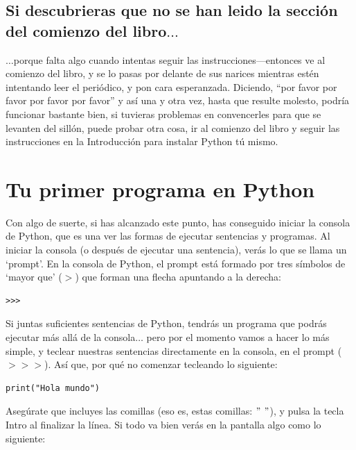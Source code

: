 \subsection*{\color{BrickRed}Si descubrieras que no se han leido la sección del comienzo del libro$\ldots$}

$\ldots$porque falta algo cuando intentas seguir las instrucciones---entonces ve al comienzo del libro, y se lo pasas por delante de sus narices mientras estén intentando leer el periódico, y pon cara esperanzada. Diciendo, ``por favor por favor por favor por favor'' y así una y otra vez, hasta que resulte molesto, podría funcionar bastante bien, si tuvieras problemas en convencerles para que se levanten del sillón, puede probar otra cosa, ir al comienzo del libro y seguir las instrucciones en la Introducción para instalar Python tú mismo.

\section{Tu primer programa en Python}

Con algo de suerte, si has alcanzado este punto, has conseguido iniciar la consola de Python, que es una ver las formas de ejecutar sentencias y programas. Al iniciar la consola (o después de ejecutar una sentencia), verás lo que se llama un `prompt'. En la consola de Python, el prompt está formado por tres símbolos de `mayor que' ($>$) que forman una flecha apuntando a la derecha:

\begin{listing}
\begin{verbatim}
>>>
\end{verbatim}
\end{listing}

Si juntas suficientes sentencias de Python, tendrás un programa que podrás ejecutar más allá de la consola$\ldots$ pero por el momento vamos a hacer lo más simple, y teclear nuestras sentencias directamente en la consola, en el prompt ($>>>$).  Así que, por qué no comenzar tecleando lo siguiente:

\begin{listing}
\begin{verbatim}
print("Hola mundo")
\end{verbatim}
\end{listing}

Asegúrate que incluyes las comillas (eso es, estas comillas: $"$ $"$), y pulsa la tecla Intro al finalizar la línea. Si todo va bien verás en la pantalla algo como lo siguiente:

